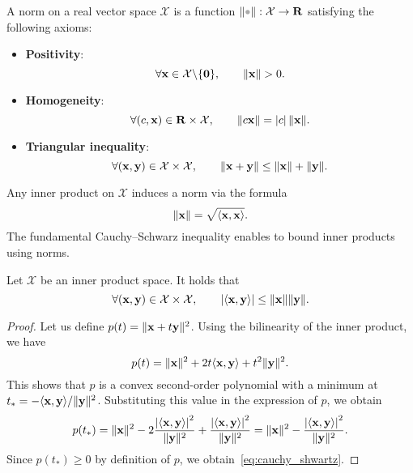 \begin{definition}
A norm on a real vector space $\mathcal X$ is a function $\norm{\placeholder}: \mathcal X \to \real$ satisfying the following axioms:
\begin{itemize}
    \item
        \textbf{Positivity}:
        \[
            \forall \mathbf x \in \mathcal X \backslash \{\mathbf 0\}, \qquad
            \lVert\mathbf x\rVert > 0.
        \]

    \item
        \textbf{Homogeneity}:
        \[
            \forall (c, \mathbf x) \in \mathbf R \times \mathcal X, \qquad
            \lVert c \mathbf x\rVert = \lvert c\rvert \, \lVert\mathbf x\rVert .
        \]

    \item
        \textbf{Triangular inequality}:
        \[
            \forall (\mathbf x, \mathbf y) \in \mathcal X \times \mathcal X, \qquad
            \lVert\mathbf x + \mathbf y\rVert \leq \lVert\mathbf x\rVert + \lVert\mathbf y\rVert.
        \]
\end{itemize}
\end{definition}
Any inner product on $\mathcal X$ induces a norm via the formula
\begin{equation}
    \label{eq:induced_norm}
    \lVert\mathbf x\rVert = \sqrt{\langle\mathbf x, \mathbf x\rangle}.
\end{equation}
The fundamental Cauchy--Schwarz inequality enables to bound inner products using norms.
\begin{proposition}
    \label{proposition:cauchy_shwartz}
    Let $\mathcal X$ be an inner product space.
    It holds that
    \begin{equation}
        \label{eq:cauchy_shwartz}
        \forall  (\vect x, \vect y) \in \mathcal X \times \mathcal X, \qquad
        \abs[big]{\ip{\vect x, \vect y}} \leq \norm{\vect x} \norm{\vect y}.
    \end{equation}
\end{proposition}
\begin{proof}
    Let us define $p(t) = \lVert\mathbf x + t \mathbf y\rVert^2$.
    Using the bilinearity of the inner product,
    we have
    \[
        p(t) = \lVert\mathbf x\rVert^2 + 2 t \langle\mathbf x, \mathbf y\rangle + t^2 \lVert\mathbf y\rVert^2.
    \]
    This shows that $p$ is a convex second-order polynomial with a minimum at $t_* = - \langle\mathbf x, \mathbf y\rangle / \lVert\mathbf y\rVert^2$.
    Substituting this value in the expression of $p$,
    we obtain
    \[
        p(t_*) = \norm{\vect x}^2 - 2 \frac{\abs[big]{\ip{\vect x, \vect y}}^2}{\norm{\vect y}^2} +  \frac{\abs[big]{\ip{\vect x, \vect y}}^2}{\norm{\vect y}^2}
        = \norm{\vect x}^2 - \frac{\abs[big]{\ip{\vect x, \vect y}}^2}{\norm{\vect y}^2}.
    \]
    Since $p(t_*) \geq 0$ by definition of $p$,
    we obtain~\eqref{eq:cauchy_shwartz}.
\end{proof}

